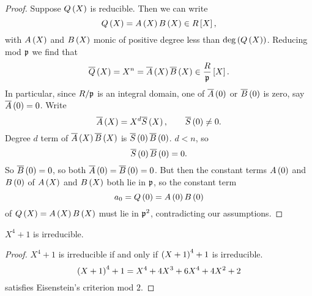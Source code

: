 \begin{proof}
Suppose $ Q\left( X \right) $ is reducible. Then we can write
$$ Q\left( X \right) = A\left( X \right)B\left( X \right) \in R\left[ X \right], $$
with $ A\left( X \right) $ and $ B\left( X \right) $ monic of positive degree less than $ \deg\left( Q\left( X \right) \right) $. Reducing mod $ \mathfrak{p} $ we find that
$$ \overline{Q}\left( X \right) = X^n = \overline{A}\left( X \right)\overline{B}\left( X \right) \in \dfrac{R}{\mathfrak{p}}\left[ X \right]. $$
In particular, since $ R / \mathfrak{p} $ is an integral domain, one of $ \overline{A}\left( 0 \right) $ or $ \overline{B}\left( 0 \right) $ is zero, say $ \overline{A}\left( 0 \right) = 0 $. Write
$$ \overline{A}\left( X \right) = X^d\overline{S}\left( X \right), \qquad \overline{S}\left( 0 \right) \ne 0. $$
Degree $ d $ term of $ \overline{A}\left( X \right)\overline{B}\left( X \right) $ is $ \overline{S}\left( 0 \right)\overline{B}\left( 0 \right) $. $ d < n $, so
$$ \overline{S}\left( 0 \right)\overline{B}\left( 0 \right) = 0. $$
So $ \overline{B}\left( 0 \right) = 0 $, so both $ \overline{A}\left( 0 \right) = \overline{B}\left( 0 \right) = 0 $. But then the constant terms $ A\left( 0 \right) $ and $ B\left( 0 \right) $ of $ A\left( X \right) $ and $ B\left( X \right) $ both lie in $ \mathfrak{p} $, so the constant term
$$ a_0 = Q\left( 0 \right) = A\left( 0 \right)B\left( 0 \right) $$
of $ Q\left( X \right) = A\left( X \right)B\left( X \right) $ must lie in $ \mathfrak{p}^2 $, contradicting our assumptions.
\end{proof}

\begin{corollary}
$ X^4 + 1 $ is irreducible.
\end{corollary}

\begin{proof}
$ X^4 + 1 $ is irreducible if and only if $ \left( X + 1 \right)^4 + 1 $ is irreducible.
$$ \left( X + 1 \right)^4 + 1 = X^4 + 4X^3 + 6X^4 + 4X^2 + 2 $$
satisfies Eisenstein's criterion mod $ 2 $.
\end{proof}


